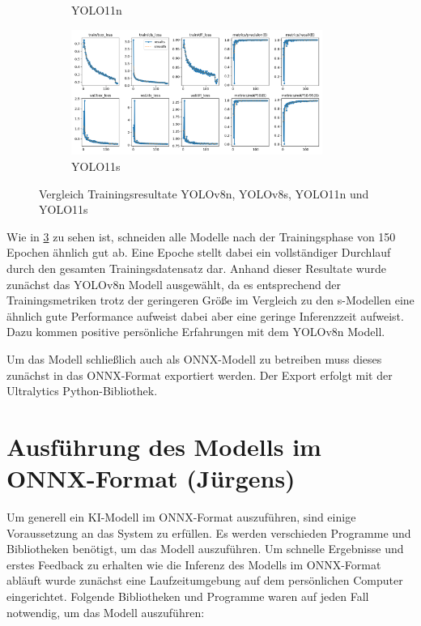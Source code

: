\begin{figure}[h]
\begin{subfigure}[b]{0.45\textwidth}
  \caption{YOLO11n}
  \label{fig:Trainingsresultate yolo11n}
\end{subfigure}
\hfill
\begin{subfigure}[b]{0.45\textwidth}
  \centering
  \includegraphics[width=0.9\textwidth]{images/Trainingsresults_yolo11s.png}
  \caption{YOLO11s}
  \label{fig:Trainingsresultate yolo11s}
\end{subfigure}
\caption{Vergleich Trainingsresultate YOLOv8n, YOLOv8s, YOLO11n und YOLO11s}
\label{tab:Vergleich Trainingsresultate}
\end{figure}



Wie in \ref{tab:Vergleich Trainingsresultate} zu sehen ist, schneiden alle Modelle nach der Trainingsphase von 150 Epochen ähnlich gut ab. Eine Epoche stellt dabei ein vollständiger Durchlauf durch den gesamten Trainingsdatensatz dar.\cite{EpochGlossary} Anhand dieser Resultate wurde zunächst das YOLOv8n Modell ausgewählt, da es entsprechend der Trainingsmetriken trotz der geringeren Größe im Vergleich zu den s-Modellen eine ähnlich gute Performance aufweist dabei aber eine geringe Inferenzzeit aufweist. Dazu kommen positive persönliche Erfahrungen mit dem YOLOv8n Modell. 


Um das Modell schließlich auch als ONNX-Modell zu betreiben muss dieses zunächst in das ONNX-Format exportiert werden. Der Export erfolgt mit der Ultralytics Python-Bibliothek.

\section{Ausführung des Modells im ONNX-Format (Jürgens)}
Um generell ein KI-Modell im ONNX-Format auszuführen, sind einige Voraussetzung an das System zu erfüllen. Es werden verschieden Programme und Bibliotheken benötigt, um das Modell auszuführen. Um schnelle Ergebnisse und erstes Feedback zu erhalten wie die Inferenz des Modells im ONNX-Format abläuft wurde zunächst eine Laufzeitumgebung auf dem persönlichen Computer eingerichtet. Folgende Bibliotheken und Programme waren auf jeden Fall notwendig, um das Modell auszuführen:

